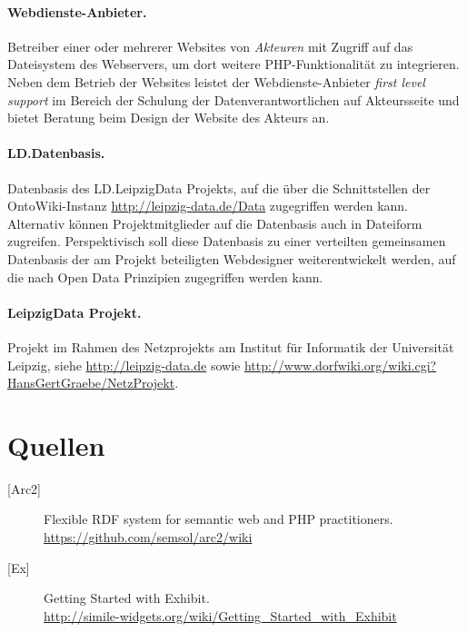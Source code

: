 \documentclass[11pt,a4paper]{article}
\begin{document}
\paragraph{Webdienste-Anbieter.} 
Betreiber einer oder mehrerer Websites von \emph{Akteuren} mit Zugriff auf das
Dateisystem des Webservers, um dort weitere PHP-Funktionalität zu integrieren.
Neben dem Betrieb der Websites leistet der Webdienste-Anbieter \emph{first
  level support} im Bereich der Schulung der Datenverantwortlichen auf
Akteursseite und bietet Beratung beim Design der Website des Akteurs an.

\paragraph{LD.Datenbasis.} 
Datenbasis des LD.LeipzigData Projekts, auf die über die Schnittstellen der
OntoWiki-Instanz \url{http://leipzig-data.de/Data} zugegriffen werden kann.
Alternativ können Projektmitglieder auf die Datenbasis auch in Dateiform
zugreifen.  Perspektivisch soll diese Datenbasis zu einer verteilten
gemeinsamen Datenbasis der am Projekt beteiligten Webdesigner weiterentwickelt
werden, auf die nach Open Data Prinzipien zugegriffen werden kann.

\paragraph{LeipzigData Projekt.} 
Projekt im Rahmen des Netzprojekts am Institut für Informatik der Universität
Leipzig, siehe \url{http://leipzig-data.de} sowie
\url{http://www.dorfwiki.org/wiki.cgi?HansGertGraebe/NetzProjekt}. 

\section{Quellen}

\begin{description}
\item[{[Arc2]}] Flexible RDF system for semantic web and PHP practitioners.\\ 
\url{https://github.com/semsol/arc2/wiki}

\item[{[Ex]}] Getting Started with Exhibit. \\
\url{http://simile-widgets.org/wiki/Getting_Started_with_Exhibit}

\end{description}
\end{document}
